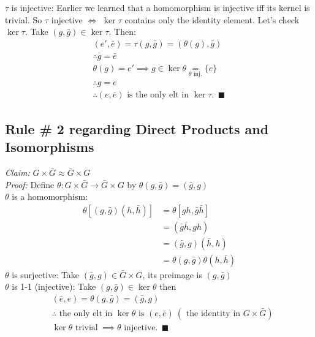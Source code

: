 $\tau$ is injective: Earlier we learned that a homomorphism is injective iff its kernel is trivial. So $\tau$ injective $\iff$ $\ker\tau$ contains only the identity element. Let's check $\ker\tau$. Take $(g,\bar{g})\in \ker\tau$. Then:
\begin{align}
    (e',\bar{e})=\tau(g,\bar{g})= (\theta(g),\bar{g}) \ \ \nonumber \\
    \therefore \bar{g}=\bar{e} \nonumber \\
    \theta(g)=e' \implies g\in \ker\theta \underset{\theta \text{ inj.}}{=} \{e\} \nonumber \\
    \therefore g=e \nonumber \\
    \therefore (e,\bar{e}) \text{ is the only elt in }\ker\tau.  \ \ \blacksquare \nonumber
\end{align}
\subsection*{Rule \# 2 regarding Direct Products and Isomorphisms}
\textit{Claim:} $G\times \bar{G}\approx \bar{G}\times G$ \steezybreak\\
\textit{Proof:} Define $\theta: G\times \bar{G}\rightarrow \bar{G}\times G$ by $\theta(g,\bar{g})=(\bar{g},g)$ \steezybreak\\
$\theta$ is a homomorphism:
\begin{align}
    \theta[(g,\bar{g})(h,\bar{h})]&= \theta[gh,\bar{g}\bar{h}] \nonumber\\
    &=(\bar{g}\bar{h},gh) \nonumber \\
    &= (\bar{g},g)(\bar{h},h) \nonumber \\
    &= \theta(g,\bar{g})\theta(h,\bar{h}) \nonumber
\end{align}
$\theta$ is surjective: Take $(\bar{g},g)\in \bar{G}\times G$, its preimage is $(g,\bar{g})$ \steezybreak\\
$\theta$ is 1-1 (injective): Take $(g,\bar{g})\in \ker\theta$ then
\begin{align}
    &(\bar{e},e)=\theta(g,\bar{g})=(\bar{g},g) \nonumber \\
    &\therefore \text{ the only elt in }\ker\theta \text{ is } (e,\bar{e}) \ (\text{ the identity in } G\times \bar{G}) \nonumber \\
    &\ker\theta \text{ trivial} \ \implies \theta \text{ injective.} \ \ \blacksquare \nonumber
\end{align}

